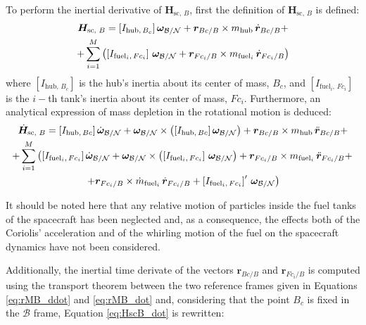 To perform the inertial derivative of $\bm{H}_{\text{sc, }B}$, first the definition of $\bm{H}_{\text{sc, }B}$ is defined:
\begin{multline}
	\bm{H}_{\text{sc, }B}= \left[I_{\text{hub},\,B_c}\right] \bm{\omega}_{\cal{B}/\cal{N}} + \bm{r}_{Bc/B} \times m_\text{hub} \,\dot{\bm{r}}_{Bc/B} +\\ +\sum_{i=1}^{M}\left(\left[I_{\text{fuel}_i,\,Fc_i}\right]\, \bm{\omega}_{\cal{B}/\cal{N}} + \bm{r}_{Fc_i/B} \times m_{\text{fuel}_i}\, \dot{\bm{r}}_{Fc_i/B}\right)
\end{multline}
where $\left[I_{\text{hub},\,B_c}\right]$ is the hub's inertia about its center of mass, $B_c$, and $\left[I_{\text{fuel}_i,\,Fc_i}\right]$ is the $i-$th tank's inertia about its center of mass, $Fc_i$. Furthermore, an analytical expression of mass depletion in the rotational motion is deduced:
\begin{multline}\label{eq:HscB_dot}
	\dot{\bm{H}}_{\text{sc, }B} = \left[I_{\text{hub},\,Bc}\right]\dot{\bm{\omega}}_{\cal{B}/\cal{N}} + \bm{\omega}_{\cal{B}/\cal{N}} \times \left(\left[I_{\text{hub},\,Bc}\right]\bm{\omega}_{\cal{B}/\cal{N}}\right)+ \bm{r}_{Bc/B} \times m_\text{hub}\,\ddot{\bm{r}}_{Bc/B} +\\
	+ \sum_{i=1}^{M}\left(\left[I_{\text{fuel}_i,\,Fc_i}\right] \dot{\bm{\omega}}_{\cal{B}/\cal{N}} + \bm{\omega}_{\cal{B}/\cal{N}} \times \left(\left[I_{\text{fuel}_i,\,Fc_i}\right]\, \bm{\omega}_{\cal{B}/\cal{N}}\right) 
	+ \bm{r}_{Fc_i/B} \times m_{\text{fuel}_i}\, \ddot{\bm{r}}_{Fc_i/B}+\right.\\ 
	\left.+ \bm{r}_{Fc_i/B} \times \dot{m}_{\text{fuel}_i} \,\dot{\bm{r}}_{Fc_i/B} + \left[I_{\text{fuel}_i,\, Fc_i}\right]' \, \bm{\omega}_{\cal{B}/\cal{N}}\right)
\end{multline}

It should be noted here that any relative motion of particles inside the fuel tanks of the spacecraft has been neglected and, as a consequence, the effects both of the Coriolis' acceleration and of the whirling motion of the fuel on the spacecraft dynamics have not been considered.

Additionally, the inertial time derivate of the vectors $\bm{r}_{Bc/B}$ and $\bm{r}_{Fc_i/B}$ is computed using the transport theorem between the two reference frames given in Equations \eqref{eq:rMB_ddot} and \eqref{eq:rMB_dot} and, considering that the point $B_c$ is fixed in the $\mathcal{B}$ frame, Equation \eqref{eq:HscB_dot} is rewritten:

